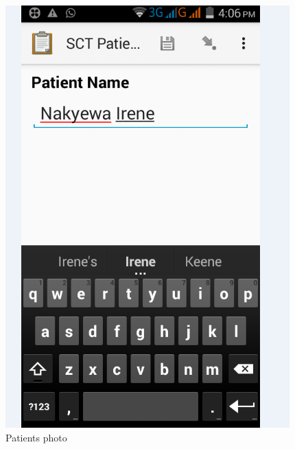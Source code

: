 \documentclass[12pt,]{article}
\begin{document}
\begin{figure}
\includegraphics[width=\linewidth]{form 1.png}
\caption{Patients photo}
\end{figure}
\end{document}
